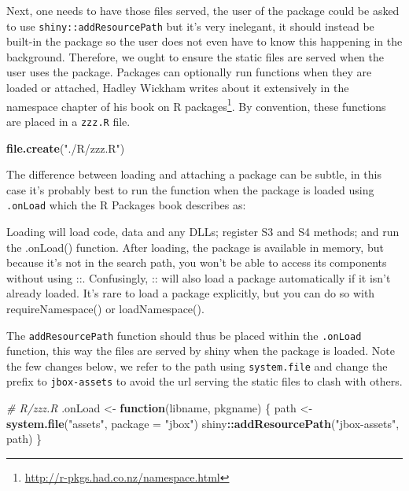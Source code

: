 \documentclass[
]{krantz}
\makeatletter
\newenvironment{Shaded}{\begin{snugshade}}{\end{snugshade}}
\newcommand{\CommentTok}[1]{\textcolor[rgb]{0.37,0.37,0.37}{\textit{#1}}}
\newcommand{\ControlFlowTok}[1]{\textcolor[rgb]{0.27,0.27,0.27}{\textbf{#1}}}
\newcommand{\DataTypeTok}[1]{\textcolor[rgb]{0.27,0.27,0.27}{#1}}
\newcommand{\KeywordTok}[1]{\textcolor[rgb]{0.27,0.27,0.27}{\textbf{#1}}}
\newcommand{\NormalTok}[1]{#1}
\newcommand{\OperatorTok}[1]{\textcolor[rgb]{0.43,0.43,0.43}{\textbf{#1}}}
\newcommand{\StringTok}[1]{\textcolor[rgb]{0.5,0.5,0.5}{#1}}
\renewenvironment{quote}{\begin{VF}}{\end{VF}}
\renewcommand{\href}[2]{#2\footnote{\url{#1}}}
\newenvironment{kframe}{%
\medskip{}
\setlength{\fboxsep}{.8em}
 \def\at@end@of@kframe{}%
 \ifinner\ifhmode%
  \def\at@end@of@kframe{\end{minipage}}%
  \begin{minipage}{\columnwidth}%
 \fi\fi%
 \def\FrameCommand##1{\hskip\@totalleftmargin \hskip-\fboxsep
 \colorbox{shadecolor}{##1}\hskip-\fboxsep
     \hskip-\linewidth \hskip-\@totalleftmargin \hskip\columnwidth}%
 \MakeFramed {\advance\hsize-\width
   \@totalleftmargin\z@ \linewidth\hsize
   \@setminipage}}%
 {\par\unskip\endMakeFramed%
 \at@end@of@kframe}
\renewenvironment{Shaded}{\begin{kframe}}{\end{kframe}}
\makeatother
\begin{document}
Next, one needs to have those files served, the user of the package could be asked to use \texttt{shiny::addResourcePath} but it's very inelegant, it should instead be built-in the package so the user does not even have to know this happening in the background. Therefore, we ought to ensure the static files are served when the user uses the package. Packages can optionally run functions when they are loaded or attached, Hadley Wickham writes about it extensively in the namespace chapter of his book on \href{http://r-pkgs.had.co.nz/namespace.html}{R packages}. By convention, these functions are placed in a \texttt{zzz.R} file.

\begin{Shaded}
\begin{Highlighting}[]
\KeywordTok{file.create}\NormalTok{(}\StringTok{"./R/zzz.R"}\NormalTok{)}
\end{Highlighting}
\end{Shaded}

The difference between loading and attaching a package can be subtle, in this case it's probably best to run the function when the package is loaded using \texttt{.onLoad} which the R Packages book describes as:

\begin{quote}
Loading will load code, data and any DLLs; register S3 and S4 methods; and run the .onLoad() function. After loading, the package is available in memory, but because it's not in the search path, you won't be able to access its components without using ::. Confusingly, :: will also load a package automatically if it isn't already loaded. It's rare to load a package explicitly, but you can do so with requireNamespace() or loadNamespace().

\end{quote}

The \texttt{addResourcePath} function should thus be placed within the \texttt{.onLoad} function, this way the files are served by shiny when the package is loaded. Note the few changes below, we refer to the path using \texttt{system.file} and change the prefix to \texttt{jbox-assets} to avoid the url serving the static files to clash with others.

\begin{Shaded}
\begin{Highlighting}[]
\CommentTok{\# R/zzz.R}
\NormalTok{.onLoad \textless{}{-}}\StringTok{ }\ControlFlowTok{function}\NormalTok{(libname, pkgname) \{}
\NormalTok{  path \textless{}{-}}\StringTok{ }\KeywordTok{system.file}\NormalTok{(}\StringTok{"assets"}\NormalTok{, }\DataTypeTok{package =} \StringTok{"jbox"}\NormalTok{)}
\NormalTok{  shiny}\OperatorTok{::}\KeywordTok{addResourcePath}\NormalTok{(}\StringTok{"jbox{-}assets"}\NormalTok{, path)}
\NormalTok{\}}
\end{Highlighting}
\end{Shaded}
\end{document}

